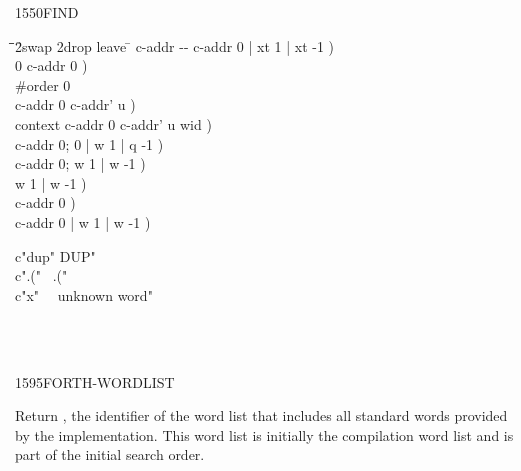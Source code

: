 \begin{worddef}{1550}{FIND}
\begin{implement}
		\begin{tabbing}
		\tab \= \tab \= \tab \= \tab \= 2swap 2drop leave \tab \= \kill
		\word{:}   c-addr -{}- c-addr 0 | xt 1 | xt -1 ) \+ \\
			0 														\>\>\>\>	 c-addr 0 ) \\
			\#order  0  \+ \\
				 							\>\>\>	 c-addr 0 c-addr' u ) \\
				  context \word{+} 		\>\>\>	 c-addr 0 c-addr' u wid ) \\
												\>\>\>	 c-addr 0; 0 | w 1 | q -1 ) \\
				 								\>\>\>	\word{p} c-addr 0; w 1 | w -1 ) \+ \\
				\>	  			\>		 w 1 | w -1 )  \\
															\>\>	 c-addr 0 ) \- \\
															\>\>\>	 c-addr 0 | w 1 | w -1 ) \- \\
		\word{;}
		\end{tabbing}
	\end{implement}

	\begin{testing}\ttfamily
		\word{:} c"dup"  DUP" \word{;} \\
		\word{:} c".("~  .("~ \word{;} \\
		\word{:} c"x"~~  unknown word" \word{;}

		 \\
		 \\
	\end{testing}
\end{worddef}


\begin{worddef}{1595}{FORTH-WORDLIST}
\item {}

	Return , the identifier of the word list that includes
	all standard words provided by the implementation. This word list
	is initially the compilation word list and is part of the initial
	search order.

	\begin{testing}
	\end{testing}
\end{worddef}



